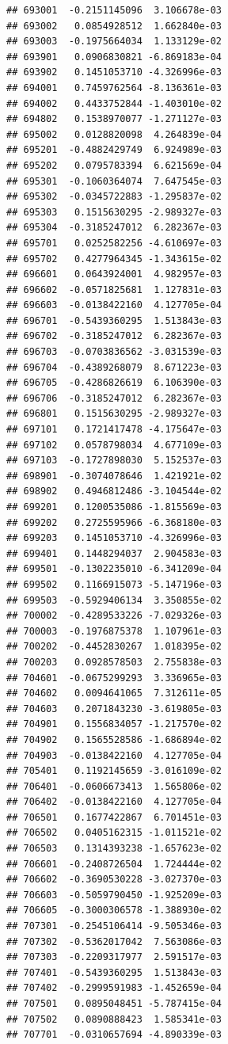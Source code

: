 \documentclass[ignorenonframetext,]{beamer}
\begin{document}
\begin{frame}[fragile]
\begin{verbatim}
## 693001  -0.2151145096  3.106678e-03
## 693002   0.0854928512  1.662840e-03
## 693003  -0.1975664034  1.133129e-02
## 693901   0.0906830821 -6.869183e-04
## 693902   0.1451053710 -4.326996e-03
## 694001   0.7459762564 -8.136361e-03
## 694002   0.4433752844 -1.403010e-02
## 694802   0.1538970077 -1.271127e-03
## 695002   0.0128820098  4.264839e-04
## 695201  -0.4882429749  6.924989e-03
## 695202   0.0795783394  6.621569e-04
## 695301  -0.1060364074  7.647545e-03
## 695302  -0.0345722883 -1.295837e-02
## 695303   0.1515630295 -2.989327e-03
## 695304  -0.3185247012  6.282367e-03
## 695701   0.0252582256 -4.610697e-03
## 695702   0.4277964345 -1.343615e-02
## 696601   0.0643924001  4.982957e-03
## 696602  -0.0571825681  1.127831e-03
## 696603  -0.0138422160  4.127705e-04
## 696701  -0.5439360295  1.513843e-03
## 696702  -0.3185247012  6.282367e-03
## 696703  -0.0703836562 -3.031539e-03
## 696704  -0.4389268079  8.671223e-03
## 696705  -0.4286826619  6.106390e-03
## 696706  -0.3185247012  6.282367e-03
## 696801   0.1515630295 -2.989327e-03
## 697101   0.1721417478 -4.175647e-03
## 697102   0.0578798034  4.677109e-03
## 697103  -0.1727898030  5.152537e-03
## 698901  -0.3074078646  1.421921e-02
## 698902   0.4946812486 -3.104544e-02
## 699201   0.1200535086 -1.815569e-03
## 699202   0.2725595966 -6.368180e-03
## 699203   0.1451053710 -4.326996e-03
## 699401   0.1448294037  2.904583e-03
## 699501  -0.1302235010 -6.341209e-04
## 699502   0.1166915073 -5.147196e-03
## 699503  -0.5929406134  3.350855e-02
## 700002  -0.4289533226 -7.029326e-03
## 700003  -0.1976875378  1.107961e-03
## 700202  -0.4452830267  1.018395e-02
## 700203   0.0928578503  2.755838e-03
## 704601  -0.0675299293  3.336965e-03
## 704602   0.0094641065  7.312611e-05
## 704603   0.2071843230 -3.619805e-03
## 704901   0.1556834057 -1.217570e-02
## 704902   0.1565528586 -1.686894e-02
## 704903  -0.0138422160  4.127705e-04
## 705401   0.1192145659 -3.016109e-02
## 706401  -0.0606673413  1.565806e-02
## 706402  -0.0138422160  4.127705e-04
## 706501   0.1677422867  6.701451e-03
## 706502   0.0405162315 -1.011521e-02
## 706503   0.1314393238 -1.657623e-02
## 706601  -0.2408726504  1.724444e-02
## 706602  -0.3690530228 -3.027370e-03
## 706603  -0.5059790450 -1.925209e-03
## 706605  -0.3000306578 -1.388930e-02
## 707301  -0.2545106414 -9.505346e-03
## 707302  -0.5362017042  7.563086e-03
## 707303  -0.2209317977  2.591517e-03
## 707401  -0.5439360295  1.513843e-03
## 707402  -0.2999591983 -1.452659e-04
## 707501   0.0895048451 -5.787415e-04
## 707502   0.0890888423  1.585341e-03
## 707701  -0.0310657694 -4.890339e-03

\end{verbatim}
\end{frame}
\end{document}
